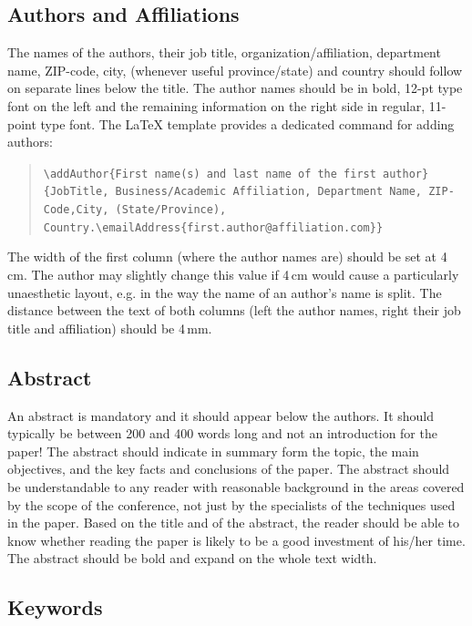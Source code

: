 \documentclass{CEAS_EuroGNC_2024}
\begin{document}
\subsection{Authors and Affiliations}

The names of the authors, their job title, organization/affiliation, department name, ZIP-code, city, (whenever useful province/state) and country should follow on separate lines below the title. The author names should be in bold, 12-pt type font on the left and the remaining information on the right side in regular, 11-point type font. The \LaTeX{} template provides a dedicated command for adding authors:

\begin{quote}\texttt{\textbackslash addAuthor\{First name(s) and last name of the first author\}\{Job\newline  Title, Business/Academic Affiliation, Department Name, ZIP-Code,\newline City, (State/Province), Country.\newline \textbackslash emailAddress\{first.author@affiliation.com\}\}}\end{quote}

The width of the first column (where the author names are) should be set at 4\,cm. The author may slightly change this value if 4\,cm would cause a particularly unaesthetic layout, e.g. in the way the name of an author's name is split. The distance between the text of both columns (left the author names, right their job title and affiliation) should be 4\,mm.

\subsection{Abstract}

An abstract is mandatory and it should appear below the authors. It should typically be between 200 and 400 words long and not an introduction for the paper! The abstract should indicate in summary form the topic, the main objectives, and the key facts and conclusions of the paper. The abstract should be understandable to any reader with reasonable background in the areas covered by the scope of the conference, not just by the specialists of the techniques used in the paper. Based on the title and of the abstract, the reader should be able to know whether reading the paper is likely to be a good investment of his/her time. The abstract should be bold and expand on the whole text width.

\subsection{Keywords}
\end{document}
